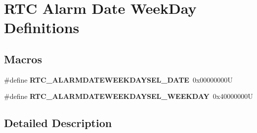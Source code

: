\hypertarget{group___r_t_c___alarm_date_week_day___definitions}{}\section{R\+TC Alarm Date Week\+Day Definitions}
\label{group___r_t_c___alarm_date_week_day___definitions}
\subsection*{Macros}
\begin{DoxyCompactItemize}
\item 
\mbox{\label{group___r_t_c___alarm_date_week_day___definitions_ga038032416e6bcf81e842f60dcfe91e15}} 
\#define {\bfseries R\+T\+C\+\_\+\+A\+L\+A\+R\+M\+D\+A\+T\+E\+W\+E\+E\+K\+D\+A\+Y\+S\+E\+L\+\_\+\+D\+A\+TE}~0x00000000U
\item 
\mbox{\label{group___r_t_c___alarm_date_week_day___definitions_ga3dfe8546eb760b9928900ac80a27e625}} 
\#define {\bfseries R\+T\+C\+\_\+\+A\+L\+A\+R\+M\+D\+A\+T\+E\+W\+E\+E\+K\+D\+A\+Y\+S\+E\+L\+\_\+\+W\+E\+E\+K\+D\+AY}~0x40000000U
\end{DoxyCompactItemize}


\subsection{Detailed Description}
